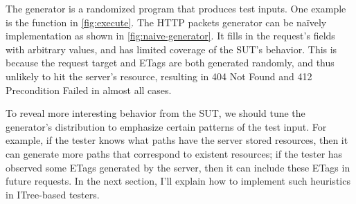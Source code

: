The generator is a randomized program that produces test inputs.  One example is
the  function in \autoref{fig:execute}.  The HTTP packets
generator can be na\"ively implementation as shown in
\autoref{fig:naive-generator}.  It fills in the request's fields with arbitrary
values, and has limited coverage of the SUT's behavior.  This is because the
request target and ETags are both generated randomly, and thus unlikely to hit
the server's resource, resulting in 404 Not Found and 412 Precondition Failed in
almost all cases.

To reveal more interesting behavior from the SUT, we should tune the generator's
distribution to emphasize certain patterns of the test input.  For example, if
the tester knows what paths have the server stored resources, then it can
generate more paths that correspond to existent resources; if the tester has
observed some ETags generated by the server, then it can include these ETags in
future requests.  In the next section, I'll explain how to implement such
heuristics in ITree-based testers.

